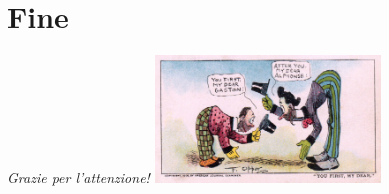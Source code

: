 \documentclass{../libs/presentation_format}
\begin{document}


\section{Fine}
\begin{frame}{}
	\huge\emph{Grazie per l'attenzione!}
	\newline
	\vfill
	\hfill\includegraphics[width=6cm]{../libs/alphonse-gaston-regards}
\end{frame}
\end{document}
